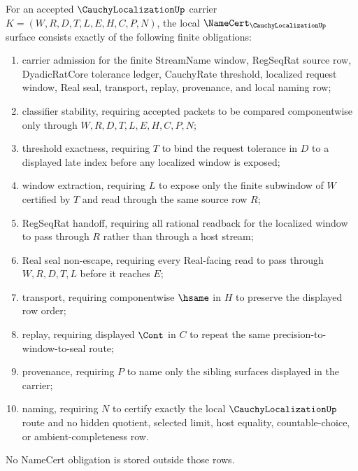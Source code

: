 \begin{theorem}
\label{thm:cauchy-localization-namecert-obligations}
For an accepted $\CauchyLocalizationUp$ carrier $K=(W,R,D,T,L,E,H,C,P,N)$, the local $\NameCert_{\CauchyLocalizationUp}$ surface consists exactly of the following finite obligations:
\begin{enumerate}
\item carrier admission for the finite StreamName window, RegSeqRat source row, DyadicRatCore tolerance ledger, CauchyRate threshold, localized request window, Real seal, transport, replay, provenance, and local naming row;
\item classifier stability, requiring accepted packets to be compared componentwise only through $W,R,D,T,L,E,H,C,P,N$;
\item threshold exactness, requiring $T$ to bind the request tolerance in $D$ to a displayed late index before any localized window is exposed;
\item window extraction, requiring $L$ to expose only the finite subwindow of $W$ certified by $T$ and read through the same source row $R$;
\item RegSeqRat handoff, requiring all rational readback for the localized window to pass through $R$ rather than through a host stream;
\item Real seal non-escape, requiring every Real-facing read to pass through $W,R,D,T,L$ before it reaches $E$;
\item transport, requiring componentwise $\hsame$ in $H$ to preserve the displayed row order;
\item replay, requiring displayed $\Cont$ in $C$ to repeat the same precision-to-window-to-seal route;
\item provenance, requiring $P$ to name only the sibling surfaces displayed in the carrier;
\item naming, requiring $N$ to certify exactly the local $\CauchyLocalizationUp$ route and no hidden quotient, selected limit, host equality, countable-choice, or ambient-completeness row.
\end{enumerate}
No NameCert obligation is stored outside those rows.
\end{theorem}
